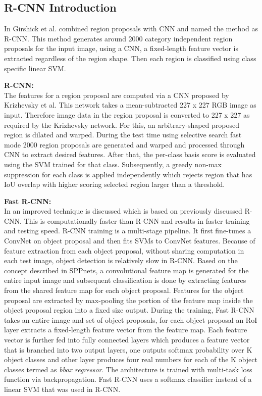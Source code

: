 \subsection{R-CNN Introduction}
In \cite{girshick2014rich} Girshick et al. combined region proposals with CNN and named the method as R-CNN. This method generates around 2000 category independent region proposals for the input image, using a CNN, a fixed-length feature vector is extracted regardless of the region shape. Then each region is classified using class specific linear SVM. 

\newpara \textbf{R-CNN:} \\
The features for a region proposal \cite{girshick2014rich, girshick2015fast, ren2015faster} are computed via a CNN proposed by Krizhevsky et al. This network takes a mean-subtracted 227 x 227 RGB image as input. Therefore image data in the region proposal is converted to 227 x 227 as required by the Krizhevsky network. For this, an arbitrary-shaped  proposed region is dilated and warped. During the test time using selective search fast mode 2000 region proposals are generated and warped and processed through CNN to extract desired features. After that, the per-class basis score is evaluated using the SVM trained for that class. Subsequently, a greedy non-max suppression for each class is applied independently which rejects region that has IoU overlap with higher scoring selected region larger than a threshold.

\newpara \textbf{Fast R-CNN:} \\
In \cite{girshick2015fast} an improved technique is discussed which is based on previously discussed R-CNN. This is computationally faster than R-CNN and results in faster training and testing speed. R-CNN training is a multi-stage pipeline. It first fine-tunes a ConvNet on object proposal and then fits SVMs to ConvNet features. Because of feature extraction from each object proposal, without sharing computation in each test image, object detection is relatively slow in R-CNN. Based on the concept described in SPPnets, a convolutional feature map is generated for the entire input image and subsequent classification is done by extracting features from the shared feature map for each object proposal. Features for the object proposal are extracted by max-pooling the portion of the feature map inside the  object proposal region into a fixed size output. During the training, Fast R-CNN takes an entire image and set of object proposals, for each object proposal an RoI layer extracts a fixed-length feature vector from the feature map. Each feature vector is further fed into fully connected layers which produces a feature vector that is branched into two output layers, one outputs softmax probability over K object classes and other layer produces four real numbers for each of the K object classes termed as \textit{bbox regressor}. The architecture is trained with multi-task loss function via backpropagation. Fast R-CNN uses a softmax classifier instead of a linear SVM that was used in R-CNN.

